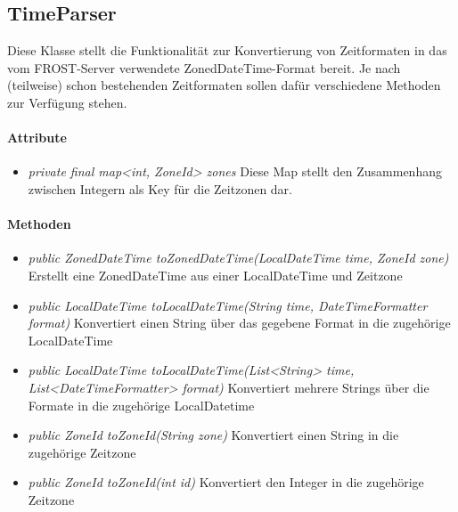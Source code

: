 \subsection{TimeParser}


Diese Klasse stellt die Funktionalität zur Konvertierung von Zeitformaten in das vom FROST-Server verwendete ZonedDateTime-Format bereit.
Je nach (teilweise) schon bestehenden Zeitformaten sollen dafür verschiedene Methoden zur Verfügung stehen.

\paragraph{Attribute}
\begin{itemize}
\item \textit{private final map<int, ZoneId> zones } Diese Map stellt den Zusammenhang zwischen Integern als Key für die Zeitzonen dar.
\end{itemize}

\paragraph{Methoden}

\begin{itemize}
\item \textit{public ZonedDateTime toZonedDateTime(LocalDateTime time, ZoneId zone)} Erstellt eine ZonedDateTime aus einer LocalDateTime und Zeitzone
\item \textit{public LocalDateTime toLocalDateTime(String time, DateTimeFormatter format)} Konvertiert einen String über das gegebene Format in die zugehörige LocalDateTime
\item \textit{public LocalDateTime toLocalDateTime(List<String> time, List<DateTimeFormatter> format)} Konvertiert mehrere Strings über die Formate in die zugehörige LocalDatetime
\item \textit{public ZoneId toZoneId(String zone)} Konvertiert einen String in die zugehörige Zeitzone
\item \textit{public ZoneId toZoneId(int id)} Konvertiert den Integer in die zugehörige Zeitzone
\end{itemize}
